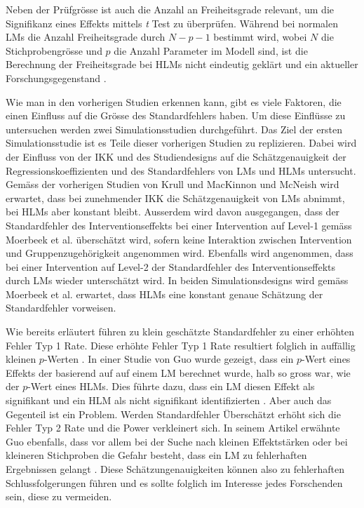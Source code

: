 \documentclass[12pt]{article}\usepackage[]{graphicx}\usepackage[]{color}
\begin{document}
Neben der Prüfgrösse ist auch die Anzahl an Freiheitsgrade relevant, um die Signifikanz eines Effekts mittels \textit{t} Test zu überprüfen. Während bei normalen LMs die Anzahl Freiheitsgrade durch $N - p - 1$ bestimmt wird, wobei $N$ die Stichprobengrösse und $p$ die Anzahl Parameter im Modell sind, ist die Berechnung der Freiheitsgrade bei HLMs nicht eindeutig geklärt und ein aktueller Forschungsgegenstand \citep{mcneish2014analyzing,raudenbush2002hierarchical,SnijdersTomA.B2012Ma:a}.

Wie man in den vorherigen Studien erkennen kann, gibt es viele Faktoren, die einen Einfluss auf die Grösse des Standardfehlers haben. Um diese Einflüsse zu untersuchen werden zwei Simulationsstudien durchgeführt. Das Ziel der ersten Simulationsstudie ist es Teile dieser vorherigen Studien zu replizieren. Dabei wird der Einfluss von der IKK und des Studiendesigns auf die Schätzgenauigkeit der Regressionskoeffizienten und des Standardfehlers von LMs und HLMs untersucht. Gemäss der vorherigen Studien von Krull und MacKinnon \citeyearpar{krullmackinnon2010mediation} und McNeish \citeyearpar{mcneish2014analyzing} wird erwartet, dass bei zunehmender IKK die Schätzgenauigkeit von LMs abnimmt, bei HLMs aber konstant bleibt. Ausserdem wird davon ausgegangen, dass der Standardfehler des Interventionseffekts bei einer Intervention auf Level-1 gemäss Moerbeek et al. \citeyearpar{MOERBEEK2003341} überschätzt wird, sofern keine Interaktion zwischen Intervention und Gruppenzugehörigkeit angenommen wird. Ebenfalls wird angenommen, dass bei einer Intervention auf Level-2 der Standardfehler des Interventionseffekts durch LMs wieder unterschätzt wird. In beiden Simulationsdesigns wird gemäss Moerbeek et al. \citeyearpar{MOERBEEK2003341} erwartet, dass HLMs eine konstant genaue Schätzung der Standardfehler vorweisen.

Wie bereits erläutert führen zu klein geschätzte Standardfehler zu einer erhöhten Fehler Typ 1 Rate. Diese erhöhte Fehler Typ 1 Rate resultiert folglich in auffällig kleinen $p$-Werten \citep{raudenbush2002hierarchical, SnijdersTomA.B2012Ma:a}. In einer Studie von Guo \citeyearpar{guo2005groupeddatahlm} wurde gezeigt, dass ein $p$-Wert eines Effekts der basierend auf auf einem LM berechnet wurde, halb so gross war, wie der $p$-Wert eines HLMs. Dies führte dazu, dass ein LM diesen Effekt als signifikant und ein HLM als nicht signifikant identifizierten \citep{guo2005groupeddatahlm}. Aber auch das Gegenteil ist ein Problem. Werden Standardfehler Überschätzt erhöht sich die Fehler Typ 2 Rate und die Power verkleinert sich. In seinem Artikel erwähnte Guo ebenfalls, dass vor allem bei der Suche nach kleinen Effektstärken oder bei kleineren Stichproben die Gefahr besteht, dass ein LM zu fehlerhaften Ergebnissen gelangt \citep{guo2005groupeddatahlm}. Diese Schätzungenauigkeiten können also zu fehlerhaften Schlussfolgerungen führen und es sollte folglich im Interesse jedes Forschenden sein, diese zu vermeiden. 
\end{document}
